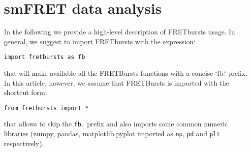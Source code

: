 \section{smFRET data analysis}

In the following we provide a high-level description of FRETbursts usage. In general, we suggest to import FRETbursts with the expression:

\verb|import fretbursts as fb|

that will make available all the FRETBursts functions with a concise `fb.` prefix. In this article, however, we assume that FRETBursts is imported with the shortcut form:

\verb|from fretbursts import *|

that allows to skip the \verb|fb.| prefix and also imports some common numeric libraries (numpy, pandas, matplotlib.pyplot imported as \verb|np|, \verb|pd| and \verb|plt| respectively).

